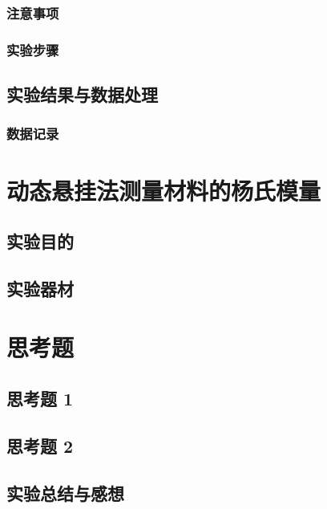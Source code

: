 \documentclass[UTF8]{article}
\theoremstyle{MyLineTheoremStyle} %
\theoremstyle{MyBlockTheoremStyle} %
\theoremstyle{MySubsubsectionStyle} %
\begin{document}
\subsubsection{注意事项}
\subsubsection{实验步骤}
\subsection{实验结果与数据处理}
\subsubsection{数据记录}

\newpage
\section{动态悬挂法测量材料的杨氏模量}
\subsection{实验目的}
\subsection{实验器材}

\newpage
\section{思考题}
\subsection{思考题 1}
\subsection{思考题 2}

\subsection{实验总结与感想}
\end{document}
